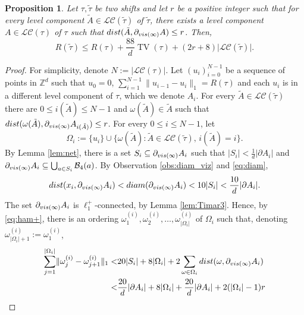 \documentclass[11pt, reqno]{amsart}
\newtheorem{proposition}[theorem]{Proposition}
\DeclareMathOperator{\TV}{TV}
\numberwithin{equation}{section}
\begin{document}
\begin{proposition}\label{prop: trip_entropy_bound_general}
Let $\tau, \tilde{\tau}$ be two shifts and let $r$ be a positive integer such that for every level component $\tilde{A}\in \mathcal{LC}(\tilde{\tau})$ of $\tilde{\tau}$, there exists a level component $A\in \mathcal{LC}(\tau)$ of $\tau$ such that ${\rm dist}(\tilde{A}, \partial_{{\rm vis}(\infty)}A) \leq r $. Then,
\begin{equation*}
R(\tilde{\tau}) \leq R(\tau) + \frac{88}{d} \TV(\tau)+(2r+8)\lvert\mathcal{LC}(\tilde{\tau})\rvert.
\end{equation*}
\end{proposition}

\begin{proof}
For simplicity, denote $N:=\lvert\mathcal{LC}(\tau)\rvert$.
Let $(u_i)_{i=0}^{N-1}$ be a sequence of points in ${\mathbb Z}^d$ such that $u_0=0$, $\sum_{i=1}^{N-1}\lVert u_{i-1}-u_i\rVert_1=R(\tau)$ and each $u_i$ is in a different level component of $\tau$, which we denote $A_i$.
For every $\tilde{A}\in \mathcal{LC}(\tilde{\tau})$ there are $0\leq i(\tilde{A})\leq N-1$ and $\omega(\tilde{A})\in \tilde{A}$ such that ${\rm dist}(\omega(\tilde{A}), \partial_{{\rm vis}(\infty)} A_{i(\tilde{A})})\leq r$.
For every $0\leq i\leq N-1$, let $$\Omega_i:=\{u_i\}\cup\{\omega(\tilde{A})\colon \tilde{A}\in\mathcal{LC}(\tilde{\tau}),\,i(\tilde{A})=i\}.
$$
By Lemma \ref{lem:net}, there is a 
set $S_i\subseteq \partial_{{\rm vis}(\infty)} A_i$ such that $\lvert S_i\rvert<\frac{1}{d}\lvert\partial A_i\rvert$ and $\partial_{{\rm vis}(\infty)} A_i\subseteq\bigcup_{a\in S_i}{\mathcal B}_4(a)$. 
By Observation \ref{obs:diam_viz} and \eqref{eq:diam}, 
$${\rm dist}(x_i,\partial_{{\rm vis}(\infty)} A_i)<{\rm diam}(\partial_{{\rm vis}(\infty)} A_i)<10\lvert S_i\rvert<\frac{10}{d}\lvert\partial A_i\rvert.$$
The set $\partial_{{\rm vis}(\infty)} A_i$ is $\ell_1^+$-connected, by Lemma \ref{lem:Timar3}. Hence, by \eqref{eq:ham+}, there is an ordering $\omega^{(i)}_1,\omega^{(i)}_2,\ldots,\omega^{(i)}_{\lvert \Omega_i\rvert}$ of $\Omega_i$ such that, denoting $\omega^{(i)}_{\lvert \Omega_i\rvert+1}:=\omega^{(i)}_1$,
\begin{align*}
\sum_{j=1}^{\lvert\Omega_i\rvert}\lVert\omega^{(i)}_j-\omega^{(i)}_{j+1}\rVert_1<& 20\lvert S_i\rvert+8\lvert\Omega_i\rvert+2\sum_{\omega\in\Omega_i}{\rm dist}(\omega,\partial_{{\rm vis}(\infty)} A_i)\\
<&\frac{20}{d}\lvert \partial A_i\rvert+8\lvert\Omega_i\rvert+\frac{20}{d}\lvert \partial A_i\rvert+2(\lvert\Omega_i\rvert-1)r\\

\end{align*}
\end{proof}
\end{document}

